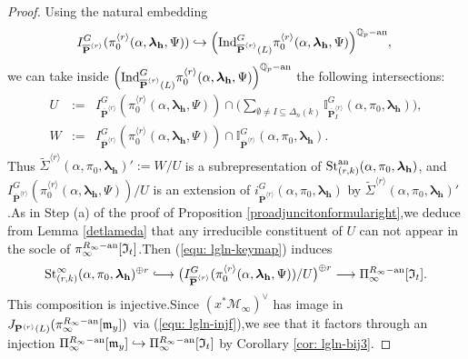 \documentclass[SecEq,CM,GP]{degruyter-crelle} %
\theoremstyle{plain}
\newcommand{\hooklongrightarrow}{\lhook\joinrel\longrightarrow}
\newcommand{\ana}{{\rm an}}
\newcommand{\ind}{{\rm Ind}}
\newcommand{\lrr}{{\langle r\rangle}}
\newcommand{\lra}{\longrightarrow}
\newcommand{\op}{{\overline{{\mathbf{P}}}}}
\newcommand{\st}{{\rm St}}
\newcommand{\BI}{{\mathbb{I}}}
\newcommand{\BQ}{{\mathbb{Q}}}
\newcommand{\bP}{{\mathbf{P}}}
\newcommand{\bh}{{\mathbf{h}}}
\newcommand{\cM}{\mathcal M}
\newcommand{\FI}{{\mathfrak{I}}}
\newcommand{\fm}{{\mathfrak{m}}}
\begin{document}
\begin{proof}
Using the natural embedding $$I_{\op^{\lrr}}^G(\pi_0^{\lrr}(\alpha,{\bm\lambda}_\bh,\Psi))  \hookrightarrow \Big(\ind_{\op^{\lrr}(L)}^{G} \pi_0^{\lrr}(\alpha,{\bm\lambda}_\bh,\Psi)\Big)^{\BQ_p-\ana},\;$$we can take inside  $\Big(\ind_{\op^{\lrr}(L)}^{G} \pi_0^{\lrr}(\alpha,{\bm\lambda}_\bh,\Psi)\Big)^{\BQ_p-\ana}$ the following intersections:
\begin{eqnarray*}U&:=&I_{\op^{\lrr}}^G(\pi_0^{\lrr}(\alpha,{\bm\lambda}_\bh,\Psi)) \cap \Big(\sum_{\emptyset\neq I\subseteq \Delta_n(k)} \BI_{\op^{\lrr}_{I}}^G(\alpha,\pi_0, {\bm\lambda}_\bh)\Big), \\
	W&:=&I_{\op^{\lrr}}^G(\pi_0^{\lrr}(\alpha,{\bm\lambda}_\bh,\Psi))\cap \BI_{\op^{\lrr}}^G(\alpha,\pi_0, {\bm\lambda}_\bh).
\end{eqnarray*}
Thus $\widetilde{\Sigma}^{\lrr}(\alpha,\pi_0, {\bm\lambda}_\bh)' :=W/U$ is a subrepresentation of $\st_{(r,k)}^{\ana}(\alpha,\pi_0, {\bm\lambda}_\bh)$, and  $I_{\op^{\lrr}}^G(\pi_0^{\lrr}(\alpha,{\bm\lambda}_\bh,\Psi))/U$ is an extension of $i_{\op^{\lrr}}^G(\alpha,\pi_0, {\bm\lambda}_\bh)$ by $\widetilde{\Sigma}^{\lrr}(\alpha,\pi_0, {\bm\lambda}_\bh)'$.\;As in Step (a) of the  proof of Proposition \ref{proadjuncitonformularight},\;we deduce from Lemma \ref{detlameda} that any irreducible constituent of $U$ can not appear in the socle of $\pi_{\infty}^{R_{\infty}-\ana}[\FI_t]$.\;Then (\ref{equ: lgln-keymap}) induces
\begin{equation}\label{equ: lgln-keymap2}
	\st_{(r,k)}^{\infty}(\alpha,\pi_0, {\bm\lambda}_\bh)^{\oplus r}\hooklongrightarrow \big(I_{\op^{\lrr}}^G (\pi_0^{\lrr}(\alpha,{\bm\lambda}_\bh,\Psi))/U\big)^{\oplus r} \lra \Pi_{\infty}^{R_{\infty}-\ana}[\FI_t].
\end{equation}
This composition is injective.\;Since $(x^* \cM_{\infty})^{\vee}$ has image in $J_{\bP^{\lrr}(L)}(\pi_{\infty}^{R_{\infty}-\ana}[\fm_y])$ via (\ref{equ: lgln-injf}),\;we see that it factors through an injection $\Pi_{\infty}^{R_{\infty}-\ana}[\fm_y]\hookrightarrow \Pi_{\infty}^{R_{\infty}-\ana}[\FI_t]$ by Corollary \ref{cor: lgln-bij3}.\;


\end{proof}
\end{document}
